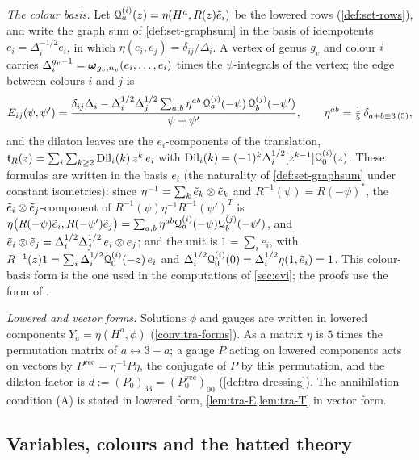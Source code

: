 \emph{The colour basis.} Let $\mathcal{Q}^{(i)}_a(z)=\eta(H^a,R(z)\tilde e_i)$ be the lowered rows (\cref{def:set-rows}), and write the graph sum of \cref{def:set-graphsum} in the basis of idempotents $e_i=\Delta_i^{-1/2}\tilde e_i$, in which $\eta(e_i,e_j)=\delta_{ij}/\Delta_i$. A vertex of genus $g_v$ and colour $i$ carries $\Delta_i^{g_v-1}=\boldsymbol{\omega}_{g_v,n_v}(e_i,\dots,e_i)$ times the $\psi$-integrals of the vertex; the edge between colours $i$ and $j$ is
\[
E_{ij}(\psi,\psi')=\frac{\delta_{ij}\Delta_i-\Delta_i^{1/2}\Delta_j^{1/2}\sum_{a,b}\eta^{ab}\,\mathcal{Q}^{(i)}_a(-\psi)\,\mathcal{Q}^{(j)}_b(-\psi')}{\psi+\psi'},\qquad \eta^{ab}=\tfrac15\,\delta_{a+b\equiv3\,(5)},
\]
and the dilaton leaves are the $e_i$-components of the translation, $\mathfrak{t}_R(z)=\sum_i\sum_{k\geq2}\mathrm{Dil}_i(k)\,z^k\,e_i$ with $\mathrm{Dil}_i(k)=(-1)^k\Delta_i^{1/2}[z^{k-1}]\mathcal{Q}^{(i)}_0(z)$. These formulas are \cite[Defs.~2.2, 2.13]{PPZ15} written in the basis $e_i$ (the naturality of \cref{def:set-graphsum} under constant isometries): since $\eta^{-1}=\sum_k\tilde e_k\otimes\tilde e_k$ and $R^{-1}(\psi)=R(-\psi)^*$, the $\tilde e_i\otimes\tilde e_j$-component of $R^{-1}(\psi)\eta^{-1}R^{-1}(\psi')^T$ is $\eta\bigl(R(-\psi)\tilde e_i,R(-\psi')\tilde e_j\bigr)=\sum_{a,b}\eta^{ab}\mathcal{Q}^{(i)}_a(-\psi)\mathcal{Q}^{(j)}_b(-\psi')$, and $\tilde e_i\otimes\tilde e_j=\Delta_i^{1/2}\Delta_j^{1/2}\,e_i\otimes e_j$; and the unit is $1=\sum_ie_i$, with $R^{-1}(z)1=\sum_i\Delta_i^{1/2}\mathcal{Q}^{(i)}_0(-z)\,e_i$ and $\Delta_i^{1/2}\mathcal{Q}^{(i)}_0(0)=\Delta_i^{1/2}\eta(1,\tilde e_i)=1$. This colour-basis form is the one used in the computations of \cref{sec:evi}; the proofs use the form of \cite{PPZ15}.

\emph{Lowered and vector forms.} Solutions $\phi$ and gauges are written in lowered components $Y_a=\eta(H^a,\phi)$ (\cref{conv:tra-forms}). As a matrix $\eta$ is $5$ times the permutation matrix of $a\leftrightarrow3-a$; a gauge $P$ acting on lowered components acts on vectors by $P^{\mathrm{vec}}=\eta^{-1}P\eta$, the conjugate of $P$ by this permutation, and the dilaton factor is $d:=(P_0)_{33}=(P_0^{\mathrm{vec}})_{00}$ (\cref{def:tra-dressing}). The annihilation condition (A) is stated in lowered form, \cref{lem:tra-E,lem:tra-T} in vector form.

\subsection{Variables, colours and the hatted theory}
\label{sec:sgn-var}

